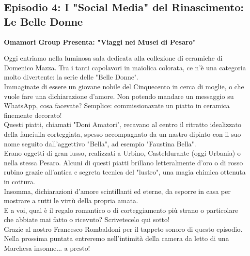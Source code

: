 \documentclass[hidelinks,12pt,a4paper]{article}
\begin{document}
\begin{flushleft}
		\subsection{Episodio 4: I "Social Media" del Rinascimento: Le Belle Donne}
		\begin{center}
			\textbf{Omamori Group Presenta: "Viaggi nei Musei di Pesaro"}
		\end{center}
		Oggi entriamo nella luminosa sala dedicata alla collezione di ceramiche di Domenico Mazza. Tra i tanti capolavori in maiolica colorata, ce n'è una categoria molto divertente: la serie delle "Belle Donne".\\
		Immaginate di essere un giovane nobile del Cinquecento in cerca di moglie, o che vuole fare una dichiarazione d'amore. Non potendo mandare un messaggio su WhatsApp, cosa facevate? Semplice: commissionavate un piatto in ceramica finemente decorato!\\
		Questi piatti, chiamati "Doni Amatori", recavano al centro il ritratto idealizzato della fanciulla corteggiata, spesso accompagnato da un nastro dipinto con il suo nome seguito dall'aggettivo "Bella", ad esempio "Faustina Bella".\\
		Erano oggetti di gran lusso, realizzati a Urbino, Casteldurante (oggi Urbania) o nella stessa Pesaro. Alcuni di questi piatti brillano letteralmente d'oro o di rosso rubino grazie all'antica e segreta tecnica del "lustro", una magia chimica ottenuta in cottura.\\
		Insomma, dichiarazioni d'amore scintillanti ed eterne, da esporre in casa per mostrare a tutti le virtù della propria amata.\\
		E a voi, qual è il regalo romantico o di corteggiamento più strano o particolare che abbiate mai fatto o ricevuto? Scrivetecelo qui sotto!\\
		Grazie al nostro Francesco Rombaldoni per il tappeto sonoro di questo episodio. Nella prossima puntata entreremo nell'intimità della camera da letto di una Marchesa insonne... a presto!\\
		

\end{flushleft}
\end{document}
